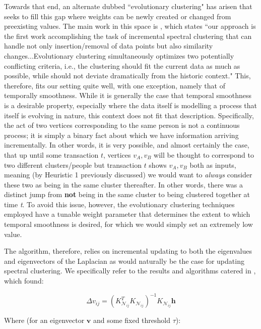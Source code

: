 \documentclass{article}
\begin{document}
Towards that end, an alternate dubbed ``evolutionary clustering" has arisen that seeks to fill this gap where weights can be newly created or changed from preexisting values. The main work in this space is \cite{incremental}, which states ``our approach is the first work accomplishing the task of incremental spectral clustering that can handle not only insertion/removal of data points but also similarity changes...Evolutionary clustering simultaneously optimizes two potentially conflicting criteria, i.e., the clustering should fit the current data as much as possible, while should not deviate dramatically from the historic context." This, therefore, fits our setting quite well, with one exception, namely that of temporally smoothness. While it is generally the case that temporal smoothness is a desirable property, especially where the data itself is modelling a process that itself is evolving in nature, this context does not fit that description. Specifically, the act of two vertices corresponding to the same person is not a continuous process; it is simply a binary fact about which we have information arriving incrementally. In other words, it is very possible, and almost certainly the case, that up until some transaction $t$, vertices $v_A,v_B$ will be thought to correspond to two different clusters/people but transaction $t$ shows $v_A,v_B$ both as inputs, meaning (by Heuristic 1 previously discussed) we would want to \textit{always} consider these two as being in the same cluster thereafter. In other words, there was a distinct jump from \textbf{not} being in the same cluster to being clustered together at time \textit{t}. To avoid this issue, however, the evolutionary clustering techniques employed have a tunable weight parameter that determines the extent to which temporal smoothness is desired, for which we would simply set an extremely low value.

The algorithm, therefore, relies on incremental updating to both the eigenvalues and eigenvectors of the Laplacian as would naturally be the case for updating spectral clustering. We specifically refer to the results and algorithms catered in \cite{incremental}, which found:

\begin{equation}
    \Delta v_{ij} = (K^T_{\mathcal{N}_{ij}} K_{\mathcal{N}_{ij}})^{-1} K_{\mathcal{N}_{ij}} \textbf{h}\label{eq:delta-v}
\end{equation}

Where (for an eigenvector $\textbf{v}$ and some fixed threshold $\tau$):
\end{document}
